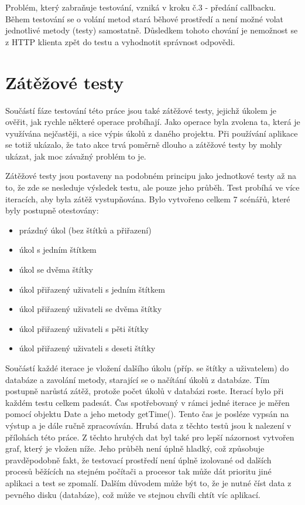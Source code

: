 Problém, který zabraňuje testování, vzniká v kroku č.3 - předání callbacku. Během testování se o volání metod stará běhové prostředí a není možné volat jednotlivé metody (testy) samostatně. Důsledkem tohoto chování je nemožnost  se z HTTP klienta zpět do testu a vyhodnotit správnost odpovědi.

\section{Zátěžové testy}

Součástí fáze testování této práce jsou také zátěžové testy, jejichž úkolem je ověřit, jak rychle některé operace probíhají. Jako operace byla zvolena ta, která je využívána nejčastěji, a sice výpis úkolů z daného projektu. Při používání aplikace se totiž ukázalo, že tato akce trvá poměrně dlouho a zátěžové testy by mohly ukázat, jak moc závažný problém to je.

Zátěžové testy jsou postaveny na podobném principu jako jednotkové testy až na to, že zde se nesleduje výsledek testu, ale pouze jeho průběh. Test probíhá ve více iteracích, aby byla zátěž vystupňována. Bylo vytvořeno celkem 7 scénářů, které byly postupně otestovány:

\begin{itemize}
\item prázdný úkol (bez štítků a přiřazení)
\item úkol s jedním štítkem
\item úkol se dvěma štítky
\item úkol přiřazený uživateli s jedním štítkem
\item úkol přiřazený uživateli se dvěma štítky
\item úkol přiřazený uživateli s pěti štítky
\item úkol přiřazený uživateli s deseti štítky
\end{itemize}

Součástí každé iterace je vložení dalšího úkolu (příp. se štítky a uživatelem) do databáze a zavolání metody, starající se o načítání úkolů z databáze. Tím postupně narůstá zátěž, protože počet úkolů v databázi roste. Iterací bylo při každém testu celkem padesát. Čas spotřebovaný v rámci jedné iterace je měřen pomocí objektu Date a jeho metody getTime(). Tento čas je posléze vypsán na výstup a je dále ručně zpracováván. Hrubá data z těchto testů jsou k nalezení v přílohách této práce. Z těchto hrubých dat byl také pro lepší názornost vytvořen graf, který je vložen níže. Jeho průběh není úplně hladký, což způsobuje pravděpodobně fakt, že testovací prostředí není úplně izolované od dalších procesů běžících na stejném počítači a procesor tak může dát prioritu jiné aplikaci a test se zpomalí. Dalším důvodem může být to, že je nutné číst data z pevného disku (databáze), což může ve stejnou chvíli chtít víc aplikací.

